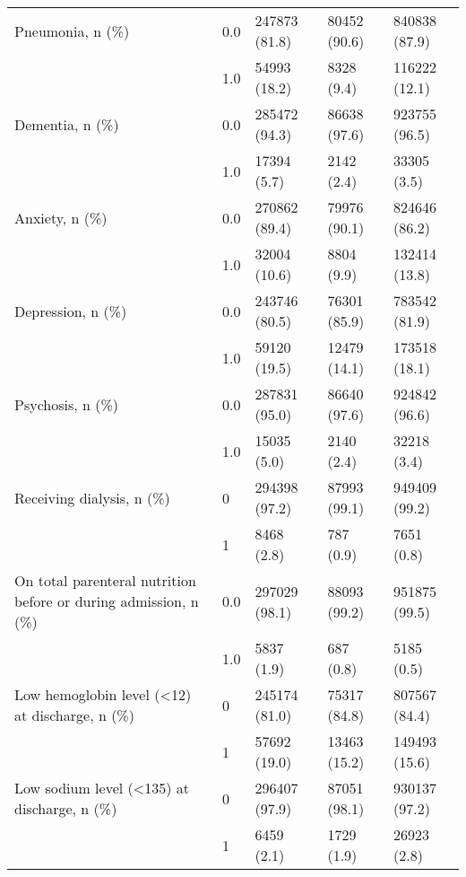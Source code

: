 \begin{tabular}{lllll}
Pneumonia, n (\%) & 0.0 &             247873 (81.8) &       80452 (90.6) &      840838 (87.9) \\
                                       & 1.0 &              54993 (18.2) &         8328 (9.4) &      116222 (12.1) \\
Dementia, n (\%) & 0.0 &             285472 (94.3) &       86638 (97.6) &      923755 (96.5) \\
                                       & 1.0 &               17394 (5.7) &         2142 (2.4) &        33305 (3.5) \\
Anxiety, n (\%) & 0.0 &             270862 (89.4) &       79976 (90.1) &      824646 (86.2) \\
                                       & 1.0 &              32004 (10.6) &         8804 (9.9) &      132414 (13.8) \\
Depression, n (\%) & 0.0 &             243746 (80.5) &       76301 (85.9) &      783542 (81.9) \\
                                       & 1.0 &              59120 (19.5) &       12479 (14.1) &      173518 (18.1) \\
Psychosis, n (\%) & 0.0 &             287831 (95.0) &       86640 (97.6) &      924842 (96.6) \\
                                       & 1.0 &               15035 (5.0) &         2140 (2.4) &        32218 (3.4) \\
Receiving dialysis, n (\%) & 0 &             294398 (97.2) &       87993 (99.1) &      949409 (99.2) \\
                                       & 1 &                8468 (2.8) &          787 (0.9) &         7651 (0.8) \\
On total parenteral nutrition before or during admission, n (\%) & 0.0 &             297029 (98.1) &       88093 (99.2) &      951875 (99.5) \\
                                       & 1.0 &                5837 (1.9) &          687 (0.8) &         5185 (0.5) \\
Low hemoglobin level (<12) at discharge, n (\%) & 0 &             245174 (81.0) &       75317 (84.8) &      807567 (84.4) \\
                                       & 1 &              57692 (19.0) &       13463 (15.2) &      149493 (15.6) \\
Low sodium level (<135) at discharge, n (\%) & 0 &             296407 (97.9) &       87051 (98.1) &      930137 (97.2) \\
                                       & 1 &                6459 (2.1) &         1729 (1.9) &        26923 (2.8) \\

\end{tabular}

